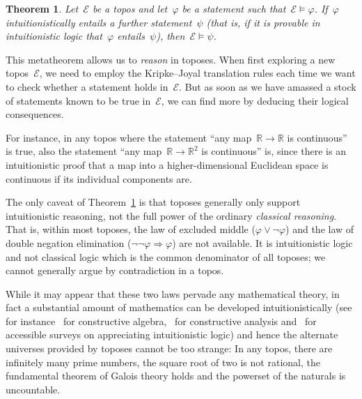 \documentclass[oneside,reqno]{amsart}
\theoremstyle{definition}
\theoremstyle{plain}
\newtheorem{thm}[defn]{Theorem}
\theoremstyle{remark}
\newcommand{\E}{\mathcal{E}}
\newcommand{\RR}{\mathbb{R}}
\renewcommand{\_}{\mathpunct{.}\,}
\newcommand{\?}{\,{:}\,}
\begin{document}
\begin{thm}\label{thm:reasoning}Let~$\E$ be a topos and let~$\varphi$ be a
statement such that~$\E \models \varphi$. If~$\varphi$ intuitionistically
entails a further statement~$\psi$ (that is, if it is provable in
intuitionistic logic that~$\varphi$ entails~$\psi$), then~$\E \models
\psi$.\end{thm}

This metatheorem allows us to \emph{reason} in toposes. When first exploring a
new topos~$\E$, we need to employ the Kripke--Joyal translation rules each time
we want to check whether a statement holds in~$\E$. But as soon as we
have amassed a stock of statements known to be true in~$\E$, we can find more
by deducing their logical consequences.

For instance, in any topos where the statement ``any map~$\RR \to \RR$ is
continuous'' is true, also the statement ``any map~$\RR \to \RR^2$ is
continuous'' is, since there is an intuitionistic proof that a map into a
higher-dimensional Euclidean space is continuous if its individual components
are.

The only caveat of Theorem~\ref{thm:reasoning} is that toposes generally only
support intuitionistic reasoning, not the full power of the ordinary
\emph{classical reasoning}. That is, within most toposes, the law of excluded
middle ($\varphi \vee \neg\varphi$) and the law of double negation elimination
($\neg\neg\varphi \Rightarrow \varphi$) are not available. It is intuitionistic
logic and not classical logic which is the common denominator of all toposes;
we cannot generally argue by contradiction in a topos.

While it may appear that these two laws pervade any mathematical theory, in
fact a substantial amount of mathematics can be developed intuitionistically
(see for
instance~\cite{mines-richman-ruitenburg:constructive-algebra,lombardi-quitte:constructive-algebra}
for constructive algebra,~\cite{bishop-bridges:constructive-analysis} for
constructive analysis
and~\cite{bauer:int-mathematics,bauer:video,melikhov:intuitionistic-logic} for
accessible surveys on appreciating intuitionistic logic) and hence the alternate universes provided by toposes
cannot be too strange: In any topos, there are infinitely many prime numbers,
the square root of two is not rational, the fundamental theorem of Galois
theory holds and the powerset of the naturals is uncountable.
\end{document}
